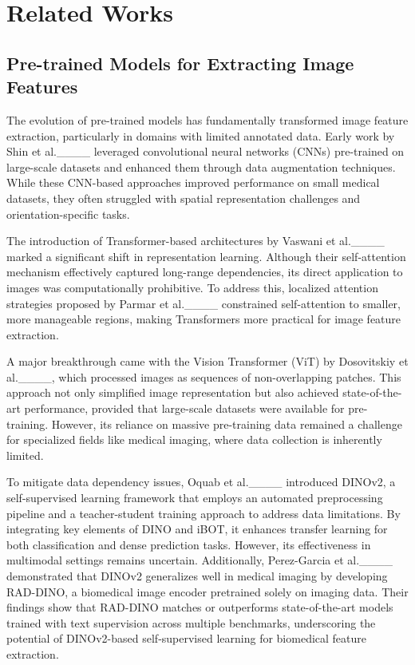 \section{Related Works}
\label{II}

\subsection{Pre-trained Models for Extracting Image Features}

The evolution of pre-trained models has fundamentally transformed image feature extraction, particularly in domains with limited annotated data. Early work by Shin et al.____ leveraged convolutional neural networks (CNNs) pre-trained on large-scale datasets and enhanced them through data augmentation techniques. While these CNN-based approaches improved performance on small medical datasets, they often struggled with spatial representation challenges and orientation-specific tasks.  

The introduction of Transformer-based architectures by Vaswani et al.____ marked a significant shift in representation learning. Although their self-attention mechanism effectively captured long-range dependencies, its direct application to images was computationally prohibitive. To address this, localized attention strategies proposed by Parmar et al.____ constrained self-attention to smaller, more manageable regions, making Transformers more practical for image feature extraction.  

A major breakthrough came with the Vision Transformer (ViT) by Dosovitskiy et al.____, which processed images as sequences of non-overlapping patches. This approach not only simplified image representation but also achieved state-of-the-art performance, provided that large-scale datasets were available for pre-training. However, its reliance on massive pre-training data remained a challenge for specialized fields like medical imaging, where data collection is inherently limited.  


To mitigate data dependency issues, Oquab et al.____ introduced DINOv2, a self-supervised learning framework that employs an automated preprocessing pipeline and a teacher-student training approach to address data limitations. By integrating key elements of DINO and iBOT, it enhances transfer learning for both classification and dense prediction tasks. However, its effectiveness in multimodal settings remains uncertain. Additionally, Perez-Garcia et al.____ demonstrated that DINOv2 generalizes well in medical imaging by developing RAD-DINO, a biomedical image encoder pretrained solely on imaging data. Their findings show that RAD-DINO matches or outperforms state-of-the-art models trained with text supervision across multiple benchmarks, underscoring the potential of DINOv2-based self-supervised learning for biomedical feature extraction.


